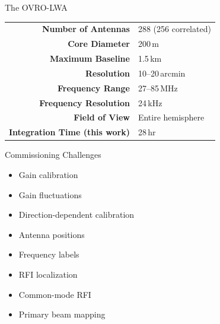 \documentclass{beamer}
\begin{document}
{
    \begin{frame}[t]{The OVRO-LWA}
        \vskip -5pt
        \small
        \begin{tabular}{rl}
            \textbf{Number of Antennas} & 288 (256 correlated) \\
            \textbf{Core Diameter} & 200\,m \\
            \textbf{Maximum Baseline} & 1.5\,km \\
            \textbf{Resolution} & 10--20\,arcmin \\
            \textbf{Frequency Range} & 27--85\,MHz \\
            \textbf{Frequency Resolution} & 24\,kHz \\
            \textbf{Field of View} & Entire hemisphere \\
            \textbf{Integration Time (this work)} & 28\,hr \\
        \end{tabular}
    \end{frame}
}

\begin{frame}{Commissioning Challenges}
    \begin{itemize}[label=\textbullet]
        \item Gain calibration
        \item Gain fluctuations
        \item {\color{yellow} Direction-dependent calibration}
        \item Antenna positions
        \item Frequency labels
        \item RFI localization
        \item Common-mode RFI
        \item Primary beam mapping
    \end{itemize}
\end{frame}
\end{document}
